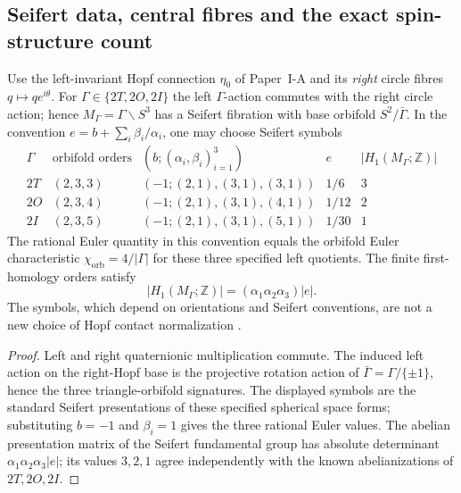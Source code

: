 \documentclass[11pt]{article}
\begin{document}
\subsection{Seifert data, central fibres and the exact spin-structure count}
\label{p1b:subsec:v12-seifert}

\begin{theorem}
\label{p1b:thm:v12-seifert-atlas}
Use the left-invariant Hopf connection $\eta_0$ of Paper~I-A and its
\emph{right} circle fibres $q\mapsto qe^{i\theta}$.
For $\Gamma\in\{2T,2O,2I\}$ the left $\Gamma$-action commutes with
the right circle action; hence $M_\Gamma=\Gamma\backslash S^3$
has a Seifert fibration with base orbifold $S^2/\bar\Gamma$.
In the convention $e=b+\sum_i\beta_i/\alpha_i$, one may choose
Seifert symbols
\[
\begin{array}{c|c|c|c|c}
\Gamma& \text{orbifold orders}&
(b;(\alpha_i,\beta_i)_{i=1}^{3})& e&|H_1(M_\Gamma;\mathbb Z)|\\ \hline
2T&(2,3,3)&(-1;(2,1),(3,1),(3,1))&1/6&3\\
2O&(2,3,4)&(-1;(2,1),(3,1),(4,1))&1/12&2\\
2I&(2,3,5)&(-1;(2,1),(3,1),(5,1))&1/30&1
\end{array}
\]
The rational Euler quantity in this convention equals the orbifold
Euler characteristic $\chi_{\mathrm{orb}}=4/|\Gamma|$ for these three
specified left quotients.  The finite first-homology orders satisfy
\[
 |H_1(M_\Gamma;\mathbb Z)|
   =(\alpha_1\alpha_2\alpha_3)|e|.
\]
The symbols, which depend on orientations and Seifert conventions,
are not a new choice of Hopf contact normalization
\cite{wolf2011spaces,BorotEynardWeisse2017Seifert}.
\end{theorem}
\begin{proof}
Left and right quaternionic multiplication commute.  The induced
left action on the right-Hopf base is the projective rotation action
of $\bar\Gamma=\Gamma/\{\pm1\}$, hence the three triangle-orbifold
signatures.  The displayed symbols are the standard Seifert
presentations of these specified spherical space forms; substituting
$b=-1$ and $\beta_i=1$ gives the three rational Euler values.
The abelian presentation matrix of the Seifert fundamental group has
absolute determinant $\alpha_1\alpha_2\alpha_3|e|$;
its values $3,2,1$ agree independently with the known
abelianizations of $2T,2O,2I$.
\end{proof}
\end{document}
